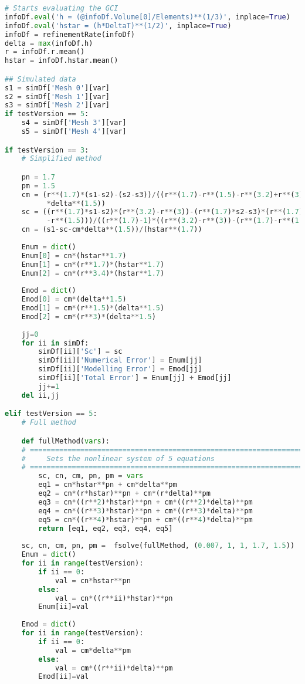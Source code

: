 \begin{lstlisting}[language=python]
# Starts evaluating the GCI
infoDf.eval('h = (@infoDf.Volume[0]/Elements)**(1/3)', inplace=True)
infoDf.eval('hstar = (h*DeltaT)**(1/2)', inplace=True)
infoDf = refinementRate(infoDf)
delta = max(infoDf.h)
r = infoDf.r.mean()
hstar = infoDf.hstar.mean()

## Simulated data
s1 = simDf['Mesh 0'][var]
s2 = simDf['Mesh 1'][var]
s3 = simDf['Mesh 2'][var]
if testVersion == 5:
    s4 = simDf['Mesh 3'][var]
    s5 = simDf['Mesh 4'][var]

if testVersion == 3:
    # Simplified method

    pn = 1.7
    pm = 1.5
    cm = (r**(1.7)*(s1-s2)-(s2-s3))/((r**(1.7)-r**(1.5)-r**(3.2)+r**(3))\
          *delta**(1.5))
    sc = ((r**(1.7)*s1-s2)*(r**(3.2)-r**(3))-(r**(1.7)*s2-s3)*(r**(1.7)\
          -r**(1.5)))/((r**(1.7)-1)*((r**(3.2)-r**(3))-(r**(1.7)-r**(1.5))))
    cn = (s1-sc-cm*delta**(1.5))/(hstar**(1.7))
    
    Enum = dict()
    Enum[0] = cn*(hstar**1.7)
    Enum[1] = cn*(r**1.7)*(hstar**1.7)
    Enum[2] = cn*(r**3.4)*(hstar**1.7)
    
    Emod = dict()
    Emod[0] = cm*(delta**1.5)
    Emod[1] = cm*(r**1.5)*(delta**1.5)
    Emod[2] = cm*(r**3)*(delta**1.5)
    
    jj=0
    for ii in simDf:
        simDf[ii]['Sc'] = sc
        simDf[ii]['Numerical Error'] = Enum[jj]
        simDf[ii]['Modelling Error'] = Emod[jj]
        simDf[ii]['Total Error'] = Enum[jj] + Emod[jj]
        jj+=1
    del ii,jj

elif testVersion == 5:
    # Full method

    def fullMethod(vars):
    # =========================================================================
    #     Sets the nonlinear system of 5 equations
    # =========================================================================
        sc, cn, cm, pn, pm = vars
        eq1 = cn*hstar**pn + cm*delta**pm
        eq2 = cn*(r*hstar)**pn + cm*(r*delta)**pm
        eq3 = cn*((r**2)*hstar)**pn + cm*((r**2)*delta)**pm
        eq4 = cn*((r**3)*hstar)**pn + cm*((r**3)*delta)**pm
        eq5 = cn*((r**4)*hstar)**pn + cm*((r**4)*delta)**pm
        return [eq1, eq2, eq3, eq4, eq5]
    
    sc, cn, cm, pn, pm =  fsolve(fullMethod, (0.007, 1, 1, 1.7, 1.5))
    Enum = dict()
    for ii in range(testVersion):
        if ii == 0:
            val = cn*hstar**pn
        else:
            val = cn*((r**ii)*hstar)**pn
        Enum[ii]=val
    
    Emod = dict()
    for ii in range(testVersion):
        if ii == 0:
            val = cm*delta**pm
        else:
            val = cm*((r**ii)*delta)**pm
        Emod[ii]=val
    

\end{lstlisting}
